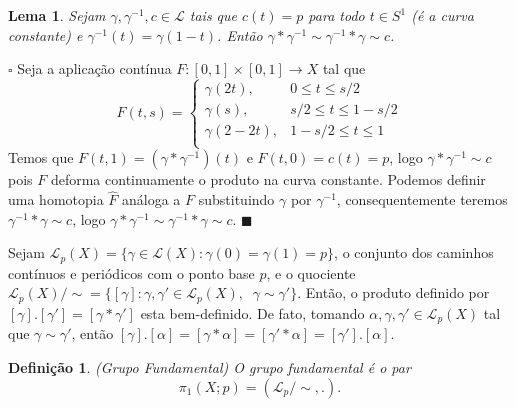 \documentclass[12pt]{book}
\newtheorem{lema}[teorema]{Lema}
\newtheorem{definicao}[teorema]{Definição}
\newenvironment{prova}[1]{$\square$ #1}{\hfill$\blacksquare$}
\newcommand{\caminhos}{\mathcal{L}}
\newcommand{\caminhospontobase}[1]{\caminhos_{#1}}
\newcommand{\caminhossempontobase}[1]{\caminhos(#1)}
\newcommand{\caminhospontobasegeral}[2]{\caminhos_{#1}(#2)}
\newcommand{\circulo}{S^{1}}
\newcommand{\classe}[1]{[#1]}
\newcommand{\grupofundamentalpontobase}[2]{\pi_{1}(#1; #2)}
\begin{document}
	\begin{lema}\label{lema_caminho_inverso}
		Sejam $\gamma, \gamma^{-1}, c \in \caminhos$ tais que $c(t) = p$ para todo $t\in \circulo$ (é a curva constante) e $\gamma^{-1}(t) = \gamma(1-t)$. Então $\gamma*\gamma^{-1} \sim \gamma^{-1}*\gamma \sim c$.
	\end{lema} 	
	\begin{prova}
		Seja a aplicação contínua $F:[0,1]\times [0,1]\to X$ tal que
		$$
		F(t,s) = 
		\left\{
		\begin{array}{cc}
		\gamma(2t), & 0\leq t \leq s/2\\
		\gamma(s), & s/2 \leq t \leq 1-s/2\\
		\gamma(2-2t), & 1-s/2 \leq t \leq 1\\
		\end{array}
		\right.
		$$
		Temos que $F(t,1) = (\gamma*\gamma^{-1})(t)$ e $F(t,0) = c(t) = p$, logo $\gamma*\gamma^{-1}\sim c$ pois $F$ deforma continuamente o produto na curva constante. Podemos definir uma homotopia $\hat{F}$ análoga a $F$ substituindo $\gamma$ por $\gamma^{-1}$, consequentemente teremos $\gamma^{-1}*\gamma \sim c$, logo $\gamma*\gamma^{-1} \sim \gamma^{-1}*\gamma \sim c$.
	\end{prova}
	
	Sejam $\caminhospontobasegeral{p}{X} = \{\gamma\in \caminhossempontobase{X}: \gamma(0)=\gamma(1)=p \}$, o conjunto dos caminhos contínuos e periódicos com o ponto base $p$, e o quociente $\caminhospontobasegeral{p}{X}/\sim = \{ \classe{\gamma} : \gamma,\gamma' \in \caminhospontobasegeral{p}{X},\;\;\gamma \sim \gamma'\}$. Então, o produto definido por $\classe{\gamma}.\classe{\gamma'} = \classe{\gamma*\gamma'}$ esta bem-definido. De fato, tomando $\alpha, \gamma, \gamma' \in \caminhospontobasegeral{p}{X}$ tal que $\gamma \sim \gamma'$, então $\classe{\gamma}.\classe{\alpha} = \classe{\gamma*\alpha} = \classe{\gamma'*\alpha} = \classe{\gamma'}.\classe{\alpha}$.
	
	\begin{definicao}
		(Grupo Fundamental) O grupo fundamental é o par 
		$$
		\grupofundamentalpontobase{X}{p} = (\caminhospontobase{p}/\sim, .).
		$$
	\end{definicao}
	
\end{document}
